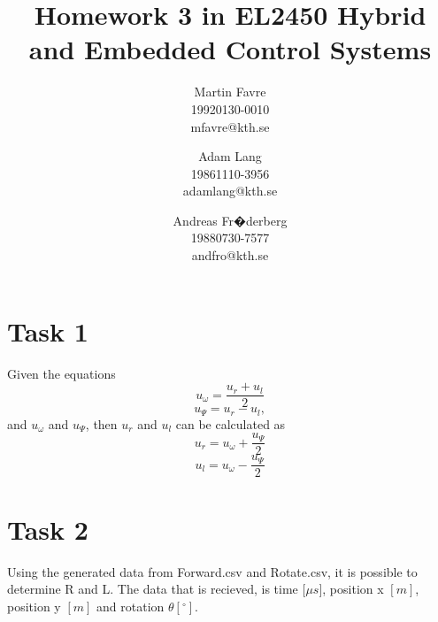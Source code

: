 \documentclass[a4paper,12pt,oneside,onecolumn]{article} %
\begin{document}

\title{Homework 3 in EL2450 Hybrid and Embedded Control Systems}
\author{
  Martin Favre \\ 19920130-0010 \\ mfavre@kth.se 
  \and 
  Adam Lang \\ 19861110-3956 \\ adamlang@kth.se
  \and
  Andreas Fr�derberg \\ 19880730-7577 \\ andfro@kth.se
  \and
  }

\maketitle                     %


\section*{Task 1}


Given the equations 
	\begin{equation}
		u_\omega = \frac{u_r + u_l}{2}
	\end{equation}
	\begin{equation}
		u_\Psi = u_r-u_l,
	\end{equation}
and $u_\omega$ and $u_\Psi$, then $u_r$ and $u_l$ can be calculated as
	\begin{equation}
		u_r = u_\omega + \frac{u_\Psi}{2}
	\end{equation}
	\begin{equation}
		u_l =  u_\omega-\frac{u_\Psi}{2}
	\end{equation}
	
\section*{Task 2}

Using the generated data from Forward.csv and Rotate.csv, it is possible
to determine R and L. The data that is recieved, is time $[\mu$$s]$,
position x $[m]$, position y $[m]$ and rotation $\theta$$[^{\circ}]$.
\end{document}

